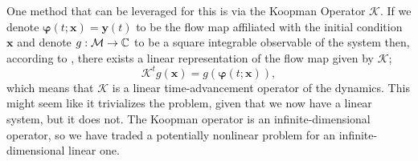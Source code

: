 One method that can be leveraged for this is via the Koopman Operator 
$\mathcal{K}$. If we denote $\boldsymbol{\varphi}(t;\boldsymbol{x}) =
\boldsymbol{y}(t)$ to be the flow map affiliated with the initial condition 
$\boldsymbol{x}$ and denote $g: \mathcal{M} \to \mathbb{C}$ to be a square integrable 
observable of the system then, according to \cite{koopman}, there exists a 
linear representation of the flow map given by $\mathcal{K}$;
\begin{equation}
    \mathcal{K}^t g(\boldsymbol{x}) = g(\boldsymbol{\varphi}(t; \boldsymbol{x})),
\end{equation}
which means that $\mathcal{K}$ is a linear time-advancement operator of the 
dynamics. This might seem like it trivializes the problem, given that we now 
have a linear system, but it does not. The Koopman operator is an 
infinite-dimensional operator, so we have traded a potentially nonlinear 
problem for an infinite-dimensional linear one.

